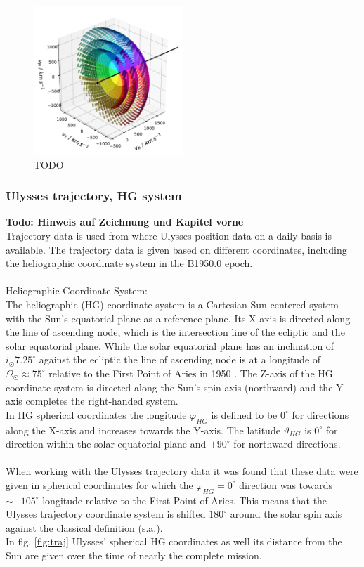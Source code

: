 %
%
\begin{figure}[h]
	\includegraphics[width=0.5\textwidth]{Figures/col_shells.pdf}
	\centering
	\caption{TODO}
	\label{TODO}
\end{figure}
\subsubsection{Ulysses trajectory, HG system}
\textbf{Todo: Hinweis auf Zeichnung und Kapitel vorne}\\
Trajectory data is used from \citet{ulysses-data-archive} where Ulysses position data on a daily basis is available. The trajectory data is given based on different coordinates, including the heliographic coordinate system in the B1950.0 epoch.
\\ \\
Heliographic Coordinate System:\\
The heliographic (HG) coordinate system is a Cartesian Sun-centered system with the Sun's equatorial plane as a reference plane. Its X-axis is directed along the line of ascending node, which is the intersection line of the ecliptic and the solar equatorial plane. While the solar equatorial plane has an inclination of $i_\odot 7.25 ^\circ$ against the ecliptic \citep{fraenz_harper} the line of ascending node is at a longitude of $\Omega_\odot \approx 75^\circ$ relative to the First Point of Aries in 1950 \citep{nasa-earth-coord}. The Z-axis of the HG coordinate system is directed along the Sun's spin axis (northward) and the Y-axis completes the right-handed system. \\
In HG spherical coordinates the longitude $\varphi_{HG}$ is defined to be $0^\circ$ for directions along the X-axis and increases towards the Y-axis. The latitude $\vartheta_{HG}$ is $0^\circ$ for direction within the solar equatorial plane and $+90^\circ$ for northward directions.\\ \\
%
%
When working with the Ulysses trajectory data it was found that these data were given in spherical coordinates for which the $\varphi_{HG} = 0^\circ$ direction was towards $\sim -105 ^\circ$ longitude relative to the First Point of Aries. This means that the Ulysses trajectory coordinate system is shifted $180^\circ$ around the solar spin axis against the classical definition (s.a.).\\
In fig. \ref{fig:traj} Ulysses' spherical HG coordinates as well its distance from the Sun are given over the time of nearly the complete mission.


